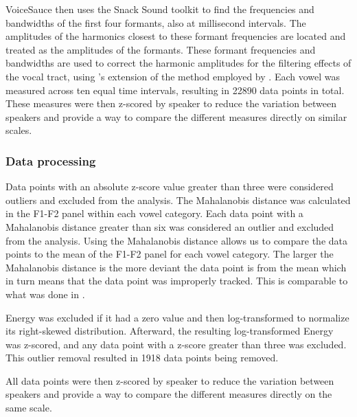 VoiceSauce then uses the Snack Sound toolkit \citep{sjolanderSnackSoundToolkit2004} to find the frequencies and bandwidths of the first four formants, also at millisecond intervals. The amplitudes of the harmonics closest to these formant frequencies are located and treated as the amplitudes of the formants. These formant frequencies and bandwidths are used to correct the harmonic amplitudes for the filtering effects of the vocal tract, using \citeauthor{iseliAgeSexVowel2007}'s \citeyear{iseliAgeSexVowel2007} extension of the method employed by \citet{hansonGlottalCharacteristicsFemale1997}. Each vowel was measured across ten equal time intervals, resulting in 22890 data points in total. These measures were then z-scored by speaker to reduce the variation between speakers and provide a way to compare the different measures directly on similar scales.

\subsubsection{Data processing} \label{sec:data_processing}
Data points with an absolute z-score value greater than three were considered outliers and excluded from the analysis. The Mahalanobis distance was calculated in the F1-F2 panel within each vowel category. Each data point with a Mahalanobis distance greater than six was considered an outlier and excluded from the analysis. Using the Mahalanobis distance allows us to compare the data points to the mean of the F1-F2 panel for each vowel category. The larger the Mahalanobis distance is the more deviant the data point is from the mean which in turn means that the data point was improperly tracked. This is comparable to what was done in \citet{seyfarthPlosiveVoicingAcoustics2018,chaiCheckedSyllablesChecked2022,garellekPhoneticsWhiteHmong2023}.

Energy was excluded if it had a zero value and then log-transformed to normalize its right-skewed distribution. Afterward, the resulting log-transformed Energy was z-scored, and any data point with a z-score greater than three was excluded. This outlier removal resulted in 1918 data points being removed. 

All data points were then z-scored by speaker to reduce the variation between speakers and provide a way to compare the different measures directly on the same scale.

